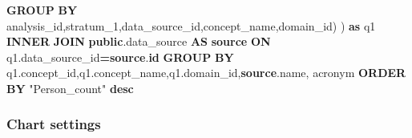 \documentclass[
]{book}
\newenvironment{Shaded}{\begin{snugshade}}{\end{snugshade}}
\newcommand{\KeywordTok}[1]{\textcolor[rgb]{0.13,0.29,0.53}{\textbf{#1}}}
\newcommand{\NormalTok}[1]{#1}
\newcommand{\OperatorTok}[1]{\textcolor[rgb]{0.81,0.36,0.00}{\textbf{#1}}}
\newcommand{\OtherTok}[1]{\textcolor[rgb]{0.56,0.35,0.01}{#1}}
\begin{document}
\begin{Shaded}
\begin{Highlighting}[]
            \KeywordTok{GROUP} \KeywordTok{BY}\NormalTok{ analysis\_id,stratum\_1,data\_source\_id,concept\_name,domain\_id) ) }\KeywordTok{as}\NormalTok{ q1}
    \KeywordTok{INNER} \KeywordTok{JOIN} \KeywordTok{public}\NormalTok{.data\_source }\KeywordTok{AS} \KeywordTok{source} \KeywordTok{ON}\NormalTok{ q1.data\_source\_id}\OperatorTok{=}\KeywordTok{source}\NormalTok{.}\KeywordTok{id}
\KeywordTok{GROUP} \KeywordTok{BY}\NormalTok{ q1.concept\_id,q1.concept\_name,q1.domain\_id,}\KeywordTok{source}\NormalTok{.name, acronym}
\KeywordTok{ORDER} \KeywordTok{BY} \OtherTok{"Person\_count"} \KeywordTok{desc}
\end{Highlighting}
\end{Shaded}

\hypertarget{chart-settings-33}{%
\subsubsection*{Chart settings}\label{chart-settings-33}}
\end{document}
